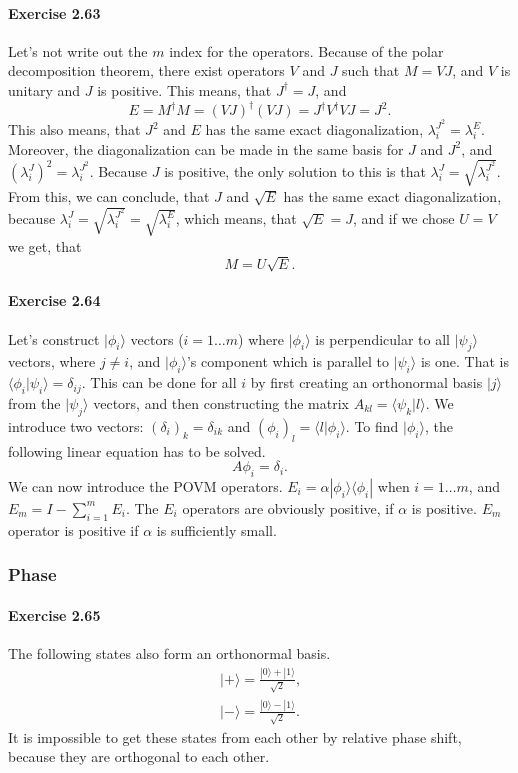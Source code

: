 \documentclass[a4paper,12pt]{article}
\newcommand{\exercise}[1]{\paragraph{Exercise #1}}
\newcommand{\la}{\langle}
\newcommand{\ra}{\rangle}
\begin{document}
    \exercise{2.63} Let's not write out the $m$ index for the operators. Because of the polar decomposition theorem, there exist operators $V$ and $J$ such that $M = VJ$, and $V$ is unitary and $J$ is positive. This means, that $J^\dagger = J$, and
    \begin{equation}
        E = M^\dagger M = (VJ)^\dagger (VJ) = J^\dagger V^\dagger V J = J^2 \textrm{.}
    \end{equation}
    This also means, that $J^2$ and $E$ has the same exact diagonalization, $\lambda^{J^2}_i = \lambda^E_i$. Moreover, the diagonalization can be made in the same basis for $J$ and $J^2$, and $(\lambda^{J}_i)^2 = \lambda^{J^2}_i$. Because $J$ is positive, the only solution to this is that $\lambda^J_i = \sqrt{\lambda^{J^2}_i}$. From this, we can conclude, that $J$ and $\sqrt{E}$ has the same exact diagonalization, because $\lambda^J_i = \sqrt{\lambda^{J^2}_i} = \sqrt{\lambda^E_i}$, which means, that $\sqrt{E} = J$, and if we chose $U = V$ we get, that
    \begin{equation}
        M = U \sqrt{E} \textrm{.}
    \end{equation}

    \exercise{2.64} Let's construct $| \phi_i \ra$ vectors ($i = 1 \ldots m$) where $| \phi_i \ra$ is perpendicular to all $| \psi_j \ra$ vectors, where $j \neq i$, and $|\phi_i\ra$'s component which is parallel to $|\psi_i\ra$ is one. That is $\la \phi_i | \psi_i \ra = \delta_{ij}$. This can be done for all $i$ by first creating an orthonormal basis $| j \ra$ from the $| \psi_j \ra$ vectors, and then constructing the matrix $A_{kl} = \la \psi_k | l \ra$. We introduce two vectors: $(\delta_i)_k = \delta_{ik}$ and $(\phi_i)_l = \la l | \phi_i \ra$. To find $| \phi_i \ra$, the following linear equation has to be solved.
    \begin{equation}
        A \phi_i = \delta_i \textrm{.}
    \end{equation}
    We can now introduce the POVM operators. $E_i = \alpha | \phi_i \ra \la \phi_i |$ when $i = 1\ldots m$, and $E_m = I - \sum_{i = 1}^m E_i$. The $E_i$ operators are obviously positive, if $\alpha$ is positive. $E_m$ operator is positive if $\alpha$ is sufficiently small.

    \subsubsection{Phase}

    \exercise{2.65} The following states also form an orthonormal basis.
    \begin{gather}
        |+ \ra = \frac{|0\ra + |1\ra}{\sqrt{2}} \textrm{,}\\
        |- \ra = \frac{|0\ra - |1\ra}{\sqrt{2}} \textrm{.}
    \end{gather}
    It is impossible to get these states from each other by relative phase shift, because they are orthogonal to each other.
\end{document}
